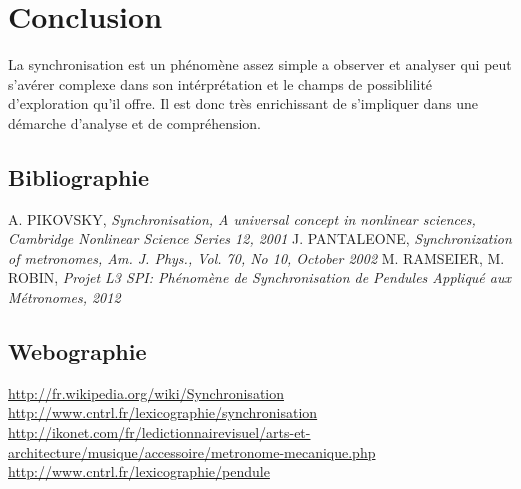 \documentclass[a4paper,11pt]{report}
\begin{document}
\chapter*{Conclusion}
La synchronisation est un phénomène assez simple a observer et analyser qui peut s'avérer complexe dans son intérprétation et le champs de possiblilité d'exploration qu'il offre. Il est donc très enrichissant de s'impliquer dans une démarche d'analyse et de compréhension.
\renewcommand{\bibname}{Références}
\begin{thebibliography}{2}
\section*{Bibliographie}
 A. PIKOVSKY, {\it Synchronisation, A universal concept in nonlinear sciences, Cambridge Nonlinear Science Series 12, 2001}
 J. PANTALEONE, {\it Synchronization of metronomes, Am. J. Phys., Vol. 70, No 10, October 2002}
 M. RAMSEIER, M. ROBIN, {\it Projet L3 SPI: Phénomène de Synchronisation de Pendules Appliqué aux Métronomes, 2012}
\section*{Webographie}
 \url{http://fr.wikipedia.org/wiki/Synchronisation}
 \url{http://www.cntrl.fr/lexicographie/synchronisation}
 \url{http://ikonet.com/fr/ledictionnairevisuel/arts-et-architecture/musique/accessoire/metronome-mecanique.php}
 \url{http://www.cntrl.fr/lexicographie/pendule}
\end{thebibliography}
\appendix
\end{document}
